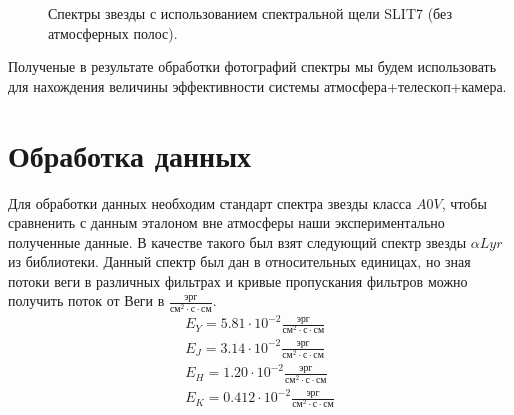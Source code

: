 \documentclass[a4paper]{article}
\begin{document}
\begin{figure}[h]
\begin{minipage}[h]{0.50\linewidth}
\end{minipage}
\begin{minipage}[h]{0.50\linewidth}
\end{minipage}
\caption{Спектры звезды с использованием спектральной щели SLIT7 (без атмосферных полос).}
\label{ris:image3}
\end{figure}

\hfill\break
Полученые в результате обработки фотографий спектры мы будем использовать для нахождения величины эффективности системы атмосфера+телескоп+камера.
\section{Обработка данных}
Для обработки данных необходим стандарт спектра звезды класса $A0V$, чтобы сравненить с данным эталоном вне атмосферы наши экспериментально полученные данные. В качестве такого был взят следующий спектр звезды $\alpha Lyr$ из библиотеки\cite{Vega}. Данный спектр был дан в относительных единицах, но зная потоки веги в различных фильтрах и кривые пропускания фильтров можно получить поток от Веги в $\frac{\text{эрг}}{\text{см}^2\cdot\text{с}\cdot\text{см}}$.
\begin{eqnarray*}
E_{Y} =  5.81\cdot10^{-2} \frac{\text{эрг}}{\text{см}^2\cdot\text{с}\cdot\text{см}}\\
E_{J} =  3.14\cdot10^{-2} \frac{\text{эрг}}{\text{см}^2\cdot\text{с}\cdot\text{см}}\\
E_{H} =  1.20\cdot10^{-2} \frac{\text{эрг}}{\text{см}^2\cdot\text{с}\cdot\text{см}}\\
E_{K} =  0.412\cdot10^{-2} \frac{\text{эрг}}{\text{см}^2\cdot\text{с}\cdot\text{см}}\\
\end{eqnarray*}
\end{document}
